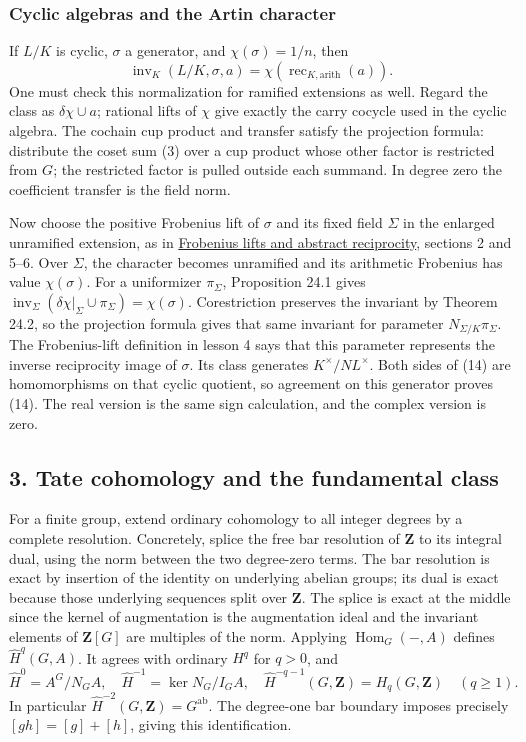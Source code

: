 \documentclass[11pt,a4paper]{article}
\begin{document}
\subsubsection{Cyclic algebras and the Artin
character}\label{cyclic-algebras-and-the-artin-character}

If \(L/K\) is cyclic, \(\sigma\) a generator, and \(\chi(\sigma)=1/n\),
then \[
\operatorname{inv}_K(L/K,\sigma,a)
=\chi(\operatorname{rec}_{K,\mathrm{arith}}(a)).
\tag{14}
\] One must check this normalization for ramified extensions as well.
Regard the class as \(\delta\chi\cup a\); rational lifts of \(\chi\)
give exactly the carry cocycle used in the cyclic algebra. The cochain
cup product and transfer satisfy the projection formula: distribute the
coset sum (3) over a cup product whose other factor is restricted from
\(G\); the restricted factor is pulled outside each summand. In degree
zero the coefficient transfer is the field norm.

Now choose the positive Frobenius lift of \(\sigma\) and its fixed field
\(\Sigma\) in the enlarged unramified extension, as in
\href{../frobenius-lifts-and-abstract-reciprocity.html}{Frobenius lifts
and abstract reciprocity}, sections 2 and 5--6. Over \(\Sigma\), the
character becomes unramified and its arithmetic Frobenius has value
\(\chi(\sigma)\). For a uniformizer \(\pi_\Sigma\), Proposition 24.1
gives
\(\operatorname{inv}_\Sigma(\delta\chi|_\Sigma\cup\pi_\Sigma)=\chi(\sigma)\).
Corestriction preserves the invariant by Theorem 24.2, so the projection
formula gives that same invariant for parameter
\(N_{\Sigma/K}\pi_\Sigma\). The Frobenius-lift definition in lesson 4
says that this parameter represents the inverse reciprocity image of
\(\sigma\). Its class generates \(K^\times/NL^\times\). Both sides of
(14) are homomorphisms on that cyclic quotient, so agreement on this
generator proves (14). The real version is the same sign calculation,
and the complex version is zero.

\subsection{3. Tate cohomology and the fundamental
class}\label{tate-cohomology-and-the-fundamental-class}

For a finite group, extend ordinary cohomology to all integer degrees by
a complete resolution. Concretely, splice the free bar resolution of
\(\mathbf Z\) to its integral dual, using the norm between the two
degree-zero terms. The bar resolution is exact by insertion of the
identity on underlying abelian groups; its dual is exact because those
underlying sequences split over \(\mathbf Z\). The splice is exact at
the middle since the kernel of augmentation is the augmentation ideal
and the invariant elements of \(\mathbf Z[G]\) are multiples of the
norm. Applying \(\operatorname{Hom}_G(-,A)\) defines
\(\widehat H^q(G,A)\). It agrees with ordinary \(H^q\) for \(q>0\), and
\[
\widehat H^0=A^G/N_GA,\quad
\widehat H^{-1}=\ker N_G/I_GA,\quad
\widehat H^{-q-1}(G,\mathbf Z)=H_q(G,\mathbf Z)\quad(q\geq1).
\tag{15}
\] In particular \(\widehat H^{-2}(G,\mathbf Z)=G^{\mathrm{ab}}\). The
degree-one bar boundary imposes precisely \([gh]=[g]+[h]\), giving this
identification.
\end{document}
